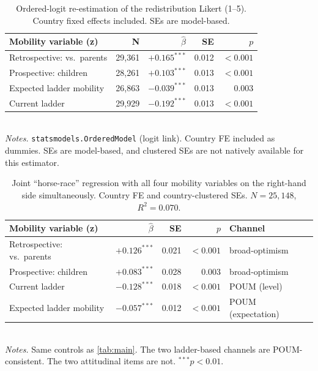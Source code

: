 \documentclass[11pt,a4paper]{article}
\begin{document}
\begin{table}[!ht]
\small
\centering
\caption{Ordered-logit re-estimation of the redistribution Likert (1--5). Country fixed
effects included. SEs are model-based.}
\label{tab:ologit}
\begin{tabular}{lrrrr}
\toprule
Mobility variable (z) & N & $\hat\beta$ & SE & $p$ \\
\midrule
Retrospective: vs.\ parents   & 29{,}361 & $+0.165^{***}$ & 0.012 & $<0.001$ \\
Prospective: children         & 28{,}261 & $+0.103^{***}$ & 0.013 & $<0.001$ \\
Expected ladder mobility      & 26{,}863 & $-0.039^{***}$ & 0.013 & 0.003    \\
Current ladder                & 29{,}929 & $-0.192^{***}$ & 0.013 & $<0.001$ \\
\bottomrule
\end{tabular}
\\\footnotesize \emph{Notes.} \texttt{statsmodels.OrderedModel} (logit link). Country FE
included as dummies. SEs are model-based, and clustered SEs are not natively available for
this estimator.
\end{table}

\begin{table}[!ht]
\small
\centering
\caption{Joint ``horse-race'' regression with all four mobility variables on the
right-hand side simultaneously. Country FE and country-clustered SEs.
$N=25{,}148$, $R^{2}=0.070$.}
\label{tab:joint}
\begin{tabular}{lrrrl}
\toprule
Mobility variable (z) & $\hat\beta$ & SE & $p$ & Channel \\
\midrule
Retrospective: vs.\ parents     & $+0.126^{***}$ & 0.021 & $<0.001$ & broad-optimism \\
Prospective: children           & $+0.083^{***}$ & 0.028 & 0.003    & broad-optimism \\
Current ladder                  & $-0.128^{***}$ & 0.018 & $<0.001$ & POUM (level) \\
Expected ladder mobility        & $-0.057^{***}$ & 0.012 & $<0.001$ & POUM (expectation) \\
\bottomrule
\end{tabular}
\\\footnotesize \emph{Notes.} Same controls as \cref{tab:main}. The two
ladder-based channels are POUM-consistent. The two attitudinal items are not.
$^{***}p<0.01$.
\end{table}
\end{document}
